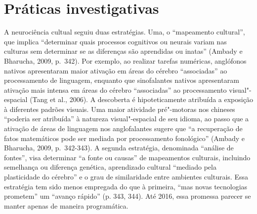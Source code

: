 \section{Práticas investigativas}

A neurociência cultual seguiu duas estratégias. Uma, o ``mapeamento
cultural'', que implica ``determinar quais processos cognitivos ou
neurais variam nas culturas sem determinar se as diferenças são
aprendidas ou inatas'' (Ambady e Bharucha, 2009, p.~342). Por exemplo, ao
realizar tarefas numéricas, anglófonos nativos apresentaram maior
ativação em áreas do cérebro ``associadas'' ao processamento de
linguagem, enquanto que sinofalantes nativos apresentaram ativação mais
intensa em áreas do cérebro ``associadas'' ao processamento
visual"-espacial (Tang et al., 2006). A descoberta é hipoteticamente
atribuída a exposição à diferentes padrões visuais. Uma maior atividade
pré"-motoras nos chineses ``poderia ser atribuída'' à natureza
visual"-espacial de seu idioma, ao passo que a ativação de áreas de
linguagem nos anglofalantes sugere que ``a recuperação de fatos
matemáticos pode ser mediada por processamento fonológico'' (Ambady e
Bharucha, 2009, p.~342-343). A segunda estratégia, denominada ``análise
de fontes'', visa determinar ``a fonte ou causas'' de mapeamentos
culturais, incluindo semelhança ou diferença genética, aprendizado
cultural ``mediado pela plasticidade do cérebro'' e o grau de
similaridade entre ambientes culturais. Essa estratégia tem sido menos
empregada do que à primeira, ``mas novas tecnologias prometem'' um
``avanço rápido'' (p. 343, 344). Até 2016, essa promessa parecer se
manter apenas de maneira programática.

